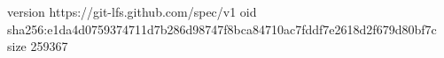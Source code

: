 version https://git-lfs.github.com/spec/v1
oid sha256:e1da4d0759374711d7b286d98747f8bca84710ac7fddf7e2618d2f679d80bf7c
size 259367
